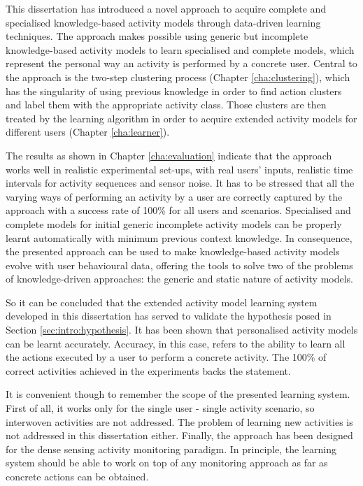 This dissertation has introduced a novel approach to acquire complete and specialised knowledge-based activity models through data-driven learning techniques. The approach makes possible using generic but incomplete knowledge-based activity models to learn specialised and complete models, which represent the personal way an activity is performed by a concrete user. Central to the approach is the two-step clustering process (Chapter \ref{cha:clustering}), which has the singularity of using previous knowledge in order to find action clusters and label them with the appropriate activity class. Those clusters are then treated by the learning algorithm in order to acquire extended activity models for different users (Chapter \ref{cha:learner}).

The results as shown in Chapter \ref{cha:evaluation} indicate that the approach works well in realistic experimental set-ups, with real users' inputs, realistic time intervals for activity sequences and sensor noise. It has to be stressed that all the varying ways of performing an activity by a user are correctly captured by the approach with a success rate of 100\% for all users and scenarios. Specialised and complete models for initial generic incomplete activity models can be properly learnt automatically with minimum previous context knowledge. In consequence, the presented approach can be used to make knowledge-based activity models evolve with user behavioural data, offering the tools to solve two of the problems of knowledge-driven approaches: the generic and static nature of activity models.

So it can be concluded that the extended activity model learning system developed in this dissertation has served to validate the hypothesis posed in Section \ref{sec:intro:hypothesis}. It has been shown that personalised activity models can be learnt accurately. Accuracy, in this case, refers to the ability to learn all the actions executed by a user to perform a concrete activity. The 100\% of correct activities achieved in the experiments backs the statement.

It is convenient though to remember the scope of the presented learning system. First of all, it works only for the single user - single activity scenario, so interwoven activities are not addressed. The problem of learning new activities is not addressed in this dissertation either. Finally, the approach has been designed for the dense sensing activity monitoring paradigm. In principle, the learning system should be able to work on top of any monitoring approach as far as concrete actions can be obtained.

